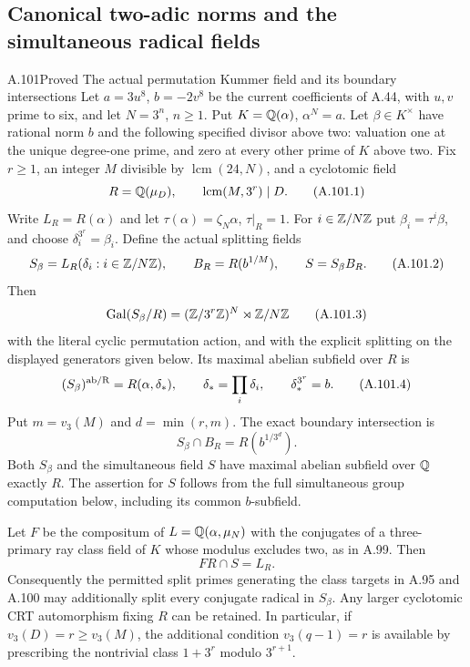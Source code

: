 \subsection{Canonical two-adic norms and the simultaneous radical fields}

\begin{statement}{A.101}{Proved}
{The actual permutation Kummer field and its boundary intersections}
Let $a=3u^8$, $b=-2v^8$ be the current coefficients of
A.44, with $u,v$ prime to six, and let $N=3^n$, $n\ge1$.
Put $K=\mathbb Q(\alpha)$, $\alpha^N=a$.
Let $\beta\in K^\times$ have rational norm $b$ and the
following specified divisor above two: valuation one
at the unique degree-one prime, and zero at every
other prime of $K$ above two.
Fix $r\ge1$, an integer $M$ divisible by $\operatorname{lcm}(24,N)$, and
a cyclotomic field
\[
 R=\mathbb Q(\mu_D),\qquad \operatorname{lcm}(M,3^r)\mid D.
 \tag{A.101.1}
\]
Write $L_R=R(\alpha)$ and let $\tau(\alpha)=\zeta_N\alpha$,
$\tau|_R=1$.
For $i\in\mathbb Z/N\mathbb Z$ put $\beta_i=\tau^i\beta$, and choose
$\delta_i^{3^r}=\beta_i$.
Define the actual splitting fields
\[
 S_\beta=L_R(\delta_i:i\in\mathbb Z/N\mathbb Z),\qquad
 B_R=R(b^{1/M}),\qquad S=S_\beta B_R.
 \tag{A.101.2}
\]
Then
\[
 \operatorname{Gal}(S_\beta/R)
          =(\mathbb Z/3^r\mathbb Z)^N\rtimes\mathbb Z/N\mathbb Z
 \tag{A.101.3}
\]
with the literal cyclic permutation action, and with
the explicit splitting on the displayed generators
given below.
Its maximal abelian subfield over $R$ is
\[
 (S_\beta)^{\rm ab/R}
      =R(\alpha,\delta_*),\qquad
      \delta_*=\prod_i\delta_i,\qquad \delta_*^{3^r}=b.
 \tag{A.101.4}
\]
Put $m=v_3(M)$ and $d=\min(r,m)$.
The exact boundary intersection is
\[
                  S_\beta\cap B_R=R(b^{1/3^d}).
 \tag{A.101.5}
\]
Both $S_\beta$ and the simultaneous field $S$ have
maximal abelian subfield over $\mathbb Q$ exactly $R$.
The assertion for $S$ follows from the full simultaneous
group computation below, including its common
$b$-subfield.

Let $F$ be the compositum of
$L=\mathbb Q(\alpha,\mu_N)$ with the conjugates of a three-primary
ray class field of $K$ whose modulus excludes two,
as in A.99.  Then
\[
                         FR\cap S=L_R.
 \tag{A.101.6}
\]
Consequently the permitted split primes generating
the class targets in A.95 and A.100 may additionally
split every conjugate radical in $S_\beta$.
Any larger cyclotomic CRT automorphism fixing $R$
can be retained.
In particular, if $v_3(D)=r\ge v_3(M)$, the additional
condition $v_3(q-1)=r$ is available by prescribing the
nontrivial class $1+3^r$ modulo $3^{r+1}$.
\end{statement}
